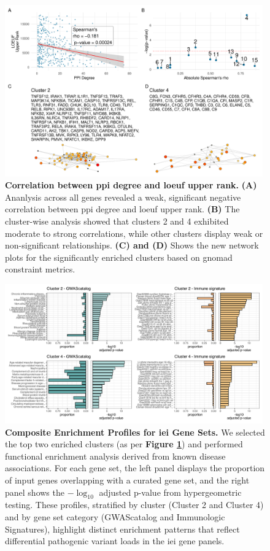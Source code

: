 \begin{figure}[h]
  \centering
  \includegraphics[width=0.99\textwidth]{../images/untangleR_ppi_network_p_cor_spear_rho_sig_clust_patch3.pdf}
  \caption{
    \textbf{Correlation between \ac{ppi} degree and \ac{loeuf} upper rank.} 
    \textbf{(A)} Ananlysis across all genes revealed a weak, significant negative correlation between \ac{ppi} degree and \ac{loeuf} upper rank. \textbf{(B)} The cluster-wise analysis showed that clusters 2 and 4 exhibited moderate to strong correlations, while other clusters display weak or non-significant relationships. \textbf{(C) and (D)} Shows the new network plots for the significantly enriched clusters based on \ac{gnomad} constraint metrics.
  }
  \label{fig:p_cor_spear_rho_sig_clust_patch3}
\end{figure}

\begin{figure}[h]
\centering
\includegraphics[width=0.99\textwidth]{../images/fuma_merge.pdf}
\caption{\textbf{Composite Enrichment Profiles for \ac{iei} Gene Sets.} 
We selected the top two enriched clusters (as per \textbf{Figure \ref{fig:p_cor_spear_rho_sig_clust_patch3}}) and performed functional enrichment analysis derived from known disease associations. For each gene set, the left panel displays the proportion of input genes overlapping with a curated gene set, and the right panel shows the \(-\log_{10}\) adjusted p-value from hypergeometric testing. These profiles, stratified by cluster (Cluster 2 and Cluster 4) and by gene set category (GWAScatalog and Immunologic Signatures), highlight distinct enrichment patterns that reflect differential pathogenic variant loads in the \ac{iei} gene panels.}
\label{fig:fuma_merge}
\end{figure}

